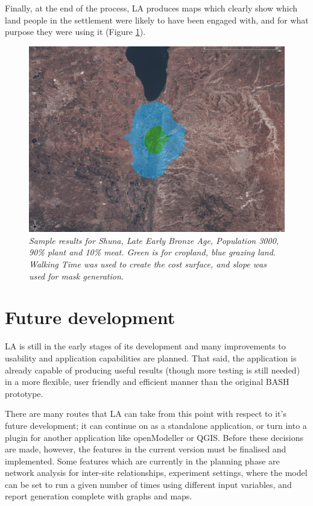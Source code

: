   Finally, at the end of the process, LA produces maps which clearly show
  which land people in the settlement were likely to have been engaged with, and
  for what purpose they were using it (Figure \ref{fig:caseStudy}).
\begin{figure}[htbp] %
  \includegraphics[scale=0.22]{./images/LEB130009010FallowSlope.jpg}
  \caption{\label{fig:caseStudy}\textit{Sample results for Shuna, Late Early Bronze Age,
    Population 3000, 90\% plant and 10\% meat.  Green is for cropland, blue grazing land.  Walking Time
    was used to create the cost surface, and slope was used for mask generation.}}
\end{figure}
\section{Future development} \label{FuturePlans} 
  LA is still in the early stages of its development and many
  improvements to usability and application capabilities are planned. That said,
  the application is already capable of producing useful results (though more
  testing is still needed) in a more flexible, user friendly and efficient
  manner than the original BASH prototype.

  There are many routes that LA can take from this point with
  respect to it's future development; it can continue on as a standalone
  application, or turn into a plugin for another application like openModeller
  or QGIS.  Before these decisions are made, however, the features in the current
  version must be finalised and implemented.  Some features which are currently
  in the planning phase are network analysis  for inter-site relationships,
  experiment settings, where the model can be set to run a given number of times
  using different input variables, and report generation complete with graphs
  and maps. 


